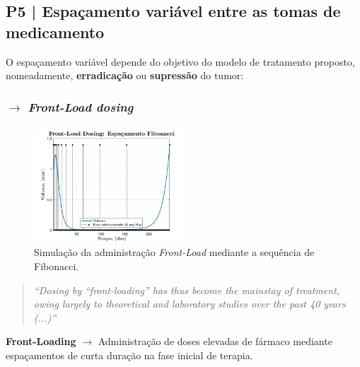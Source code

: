 \clearpage
\subsection{P5 | Espaçamento variável entre as tomas de medicamento}
\label{subsec:P5}
O espaçamento variável depende do objetivo do modelo de tratamento proposto, nomeadamente, \textbf{erradicação} ou \textbf{supressão} do tumor:
\vspace{-1em}
\subsubsection{$\pmb{\xrightarrow[]{}}$ \textit{Front-Load dosing}}
\label{subsubsec:front-load-dosing}
\vspace{-2.5em}
\hspace*{-0cm}\begin{figure}
    \centering
    \includegraphics[width=0.5\textwidth]{img/perguntas/P5/P5-Fib.png}
    \vspace{-0.1em}\begin{minipage}{1\linewidth}
        \caption{Simulação da administração \textit{Front-Load} mediante a sequência de Fibonacci.}
        \label{fig:P5-fib}
    \end{minipage}
\end{figure}

\begin{quote}
     \textit{``Dosing by ``front-loading'' has thus become the mainstay of treatment, owing largely to theoretical and laboratory studies over the past 40 years (...)''}\cite{Hahnfeldt2003-oy}
\end{quote}

\textbf{Front-Loading} $\rightarrow$ Administração de doses elevadas de fármaco mediante espaçamentos de curta duração na fase inicial de terapia.

\vphantom{esperiencia123}

